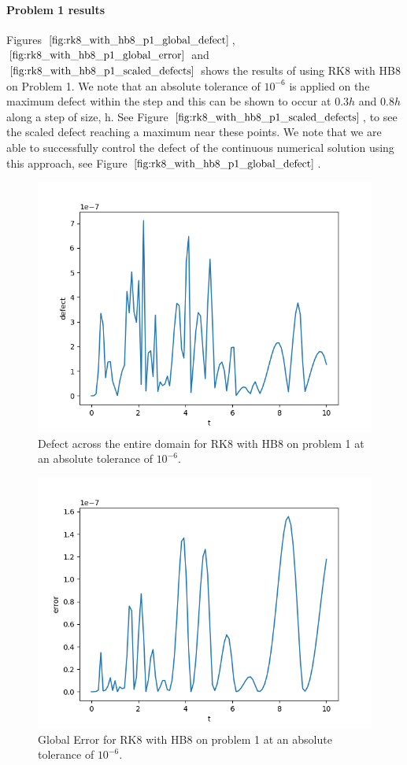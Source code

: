 \paragraph{Problem 1 results}
Figures $\ref{fig:rk8_with_hb8_p1_global_defect}$, $\ref{fig:rk8_with_hb8_p1_global_error}$ and $\ref{fig:rk8_with_hb8_p1_scaled_defects}$ shows the results of using RK8 with HB8 on Problem 1. We note that an absolute tolerance of $10^{-6}$ is applied on the maximum defect within the step and this can be shown to occur at $0.3h$ and $0.8h$ along a step of size, h. See Figure $\ref{fig:rk8_with_hb8_p1_scaled_defects}$, to see the scaled defect reaching a maximum near these points. We note that we are able to successfully control the defect of the continuous numerical solution using this approach, see Figure $\ref{fig:rk8_with_hb8_p1_global_defect}$. 
 

\begin{figure}[H]
\centering
\includegraphics[width=0.7\linewidth]{./figures/rk8_with_hb8_p1_global_defect}
\caption{Defect across the entire domain for RK8 with HB8 on problem 1 at an absolute tolerance of $10^{-6}$.}
\label{fig:rk8_with_hb8_p1_global_defect}
\end{figure}

\begin{figure}[H]
\centering
\includegraphics[width=0.7\linewidth]{./figures/rk8_with_hb8_p1_global_error}
\caption{Global Error for RK8 with HB8 on problem 1 at an absolute tolerance of $10^{-6}$.}
\label{fig:rk8_with_hb8_p1_global_error}
\end{figure}

